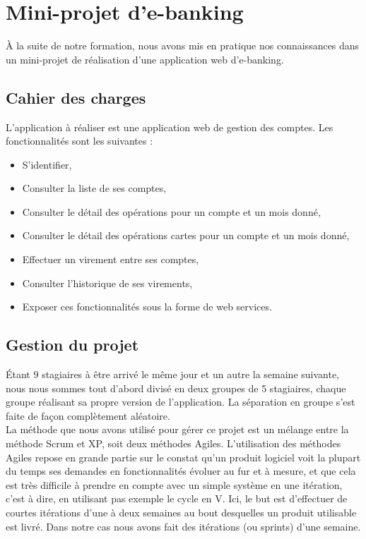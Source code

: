 \section{Mini-projet d'e-banking}

À la suite de notre formation, nous avons mis en pratique nos connaissances dans un mini-projet de réalisation d'une application web d'e-banking.

\subsection{Cahier des charges}

L'application à réaliser est une application web de gestion des comptes. Les fonctionnalités sont les suivantes :

\begin{itemize}
	\item S'identifier,
	\item Consulter la liste de ses comptes,
	\item Consulter le détail des opérations pour un compte et un mois donné,
	\item Consulter le détail des opérations cartes pour un compte et un mois donné,
	\item Effectuer un virement entre ses comptes,
	\item Consulter l'historique de ses virements,
	\item Exposer ces fonctionnalités sous la forme de web services.
\end{itemize}

\subsection{Gestion du projet}

Étant 9 stagiaires à être arrivé le même jour et un autre la semaine suivante, nous nous sommes tout d'abord divisé en deux groupes de 5 stagiaires, chaque groupe réalisant sa propre version de l'application. La séparation en groupe s'est faite de façon complètement aléatoire.\\

La méthode que nous avons utilisé pour gérer ce projet est un mélange entre la méthode Scrum et XP, soit deux méthodes Agiles. L’utilisation des méthodes Agiles repose en grande partie sur le constat qu’un produit logiciel voit la plupart du temps ses demandes en fonctionnalités évoluer au fur et à mesure, et que cela est très difficile à prendre en compte avec un simple système en une itération, c'est à dire, en utilisant pas exemple le cycle en V. Ici, le but est d’effectuer de courtes itérations d’une à deux semaines au bout desquelles un produit utilisable est livré. Dans notre cas nous avons fait des itérations (ou sprints) d'une semaine.\\

